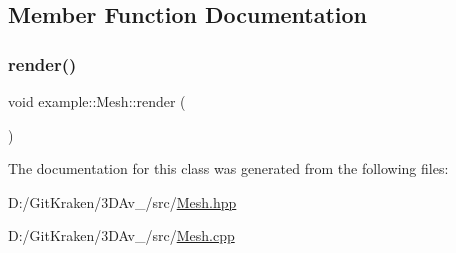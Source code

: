 \subsection{Member Function Documentation}
\mbox{\label{classexample_1_1_mesh_a7832f40434d9fd0fd8fc64d5b81a6f0b}} 
\subsubsection{\texorpdfstring{render()}{render()}}
{\footnotesize\ttfamily void example\+::\+Mesh\+::render (\begin{DoxyParamCaption}{ }\end{DoxyParamCaption})}



The documentation for this class was generated from the following files\+:\begin{DoxyCompactItemize}
\item 
D\+:/\+Git\+Kraken/3\+D\+Av\+\_/src/\mbox{\hyperlink{_mesh_8hpp}{Mesh.\+hpp}}\item 
D\+:/\+Git\+Kraken/3\+D\+Av\+\_/src/\mbox{\hyperlink{_mesh_8cpp}{Mesh.\+cpp}}\end{DoxyCompactItemize}
